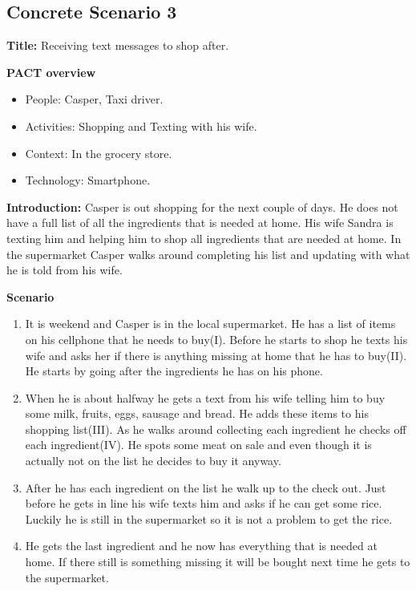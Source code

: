 \subsection{Concrete Scenario 3} \label{ConcreteScenario3}

\textbf{Title:} Receiving text messages to shop after.

\textbf{PACT overview}
\begin{itemize}
\item People: Casper, Taxi driver.  
\item Activities: Shopping and Texting with his wife.
\item Context: In the grocery store.
\item Technology: Smartphone.
\end{itemize}

\textbf{Introduction:} Casper is out shopping for the next couple of days. He does not have a full list of all the ingredients that is needed at home. His wife Sandra is texting him and helping him to shop all ingredients that are needed at home. In the supermarket Casper walks around completing his list and updating with what he is told from his wife.  

\textbf{Scenario}
\begin{enumerate}
\item It is weekend and Casper is in the local supermarket. He has a list of items on his cellphone that he needs to buy(I). Before he starts to shop he texts his wife and asks her if there is anything missing at home that he has to buy(II). He starts by going after the ingredients he has on his phone.   
\item  When he is about halfway he gets a text from his wife telling him to buy some milk, fruits, eggs, sausage and bread. He adds these items to his shopping list(III). As he walks around collecting each ingredient he checks off each ingredient(IV). He spots some meat on sale and even though it is actually not on the list he decides to buy it anyway.  
\item After he has each ingredient on the list he walk up to the check out. Just before he gets in line his wife texts him and asks if he can get some rice. Luckily he is still in the supermarket so it is not a problem to get the rice.  
\item He gets the last ingredient and he now has everything that is needed at home. If there still is something missing it will be bought next time he gets to the supermarket.
\end{enumerate}

